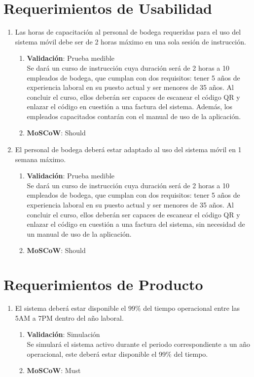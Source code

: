 \documentclass{scrreprt}
\begin{document}
\section{Requerimientos de Usabilidad}

\begin{enumerate}


    \item Las horas de capacitación al personal de bodega requeridas para el uso del sistema móvil debe ser de 2 horas máximo en una sola sesión de instrucción.
    \begin{enumerate}
        \item \textbf{Validación}: Prueba medible\\
        Se dará un curso de instrucción cuya duración será de 2 horas a 10 empleados de bodega, que cumplan con dos requisitos: tener 5 años de experiencia laboral en su puesto actual y ser menores de 35 años. Al concluir el curso, ellos deberán ser capaces de escanear el código QR y enlazar el código en cuestión a una factura del sistema. Además, los empleados capacitados contarán con el manual de uso de la aplicación.
        \item \textbf{MoSCoW}: Should
    \end{enumerate}
    
    
    \item El personal de bodega deberá estar adaptado al uso del sistema móvil en 1 semana máximo.
    \begin{enumerate}
        \item \textbf{Validación}: Prueba medible\\
        Se dará un curso de instrucción cuya duración será de 2 horas a 10 empleados de bodega, que cumplan con dos requisitos: tener 5 años de experiencia laboral en su puesto actual y ser menores de 35 años. Al concluir el curso, ellos deberán ser capaces de escanear el código QR y enlazar el código en cuestión a una factura del sistema, sin necesidad de un manual de uso de la aplicación.
        \item \textbf{MoSCoW}: Should
    \end{enumerate}
    
    
\end{enumerate}

\section{Requerimientos de Producto}

\begin{enumerate}
    \item El sistema deberá estar disponible el 99\% del tiempo operacional entre las 5AM a 7PM dentro del año laboral. 
    \begin{enumerate}
        \item \textbf{Validación}: Simulación\\
        Se simulará el sistema activo durante el periodo correspondiente a un año operacional, este deberá estar disponible el 99\% del tiempo. 
        \item \textbf{MoSCoW}: Must
    \end{enumerate}
\end{enumerate}
\end{document}
